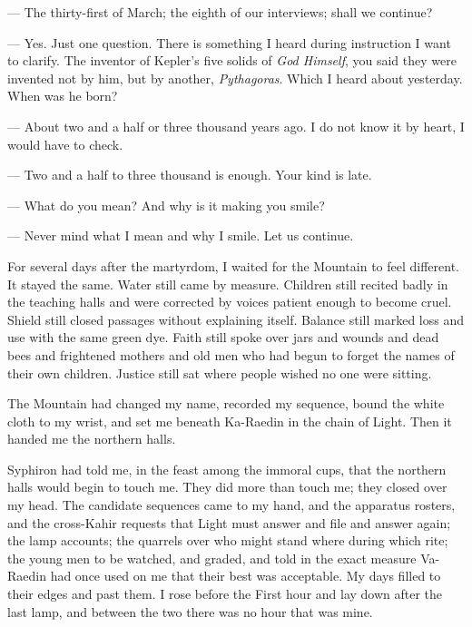 
\begin{room}

--- The thirty-first of March; the eighth of our interviews; shall we continue?

--- Yes. Just one question. There is something I heard during instruction I want to clarify. The inventor of Kepler's five solids of \textit{God Himself}, you said they were invented not by him, but by another, \textit{Pythagoras}. Which I heard about yesterday. When was he born?

--- About two and a half or three thousand years ago. I do not know it by heart, I would have to check.

--- Two and a half to three thousand is enough. Your kind is late. 

--- What do you mean? And why is it making you smile?

--- Never mind what I mean and why I smile. Let us continue.

\end{room}


For several days after the martyrdom, I waited for the Mountain to feel different. It stayed the same. Water still came by measure. Children still recited badly in the teaching halls and were corrected by voices patient enough to become cruel. Shield still closed passages without explaining itself. Balance still marked loss and use with the same green dye. Faith still spoke over jars and wounds and dead bees and frightened mothers and old men who had begun to forget the names of their own children. Justice still sat where people wished no one were sitting.\par

The Mountain had changed my name, recorded my sequence, bound the white cloth to my wrist, and set me beneath Ka-Raedin in the chain of Light. Then it handed me the northern halls.\par

Syphiron had told me, in the feast among the immoral cups, that the northern halls would begin to touch me. They did more than touch me; they closed over my head. The candidate sequences came to my hand, and the apparatus rosters, and the cross-Kahir requests that Light must answer and file and answer again; the lamp accounts; the quarrels over who might stand where during which rite; the young men to be watched, and graded, and told in the exact measure Va-Raedin had once used on me that their best was acceptable. My days filled to their edges and past them. I rose before the First hour and lay down after the last lamp, and between the two there was no hour that was mine.\par

